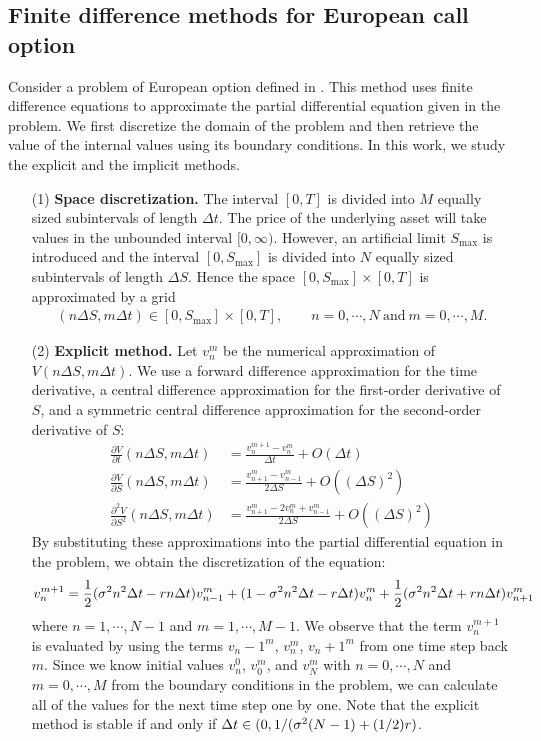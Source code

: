 \documentclass[11pt,letter]{article}
\def\D{\Delta} \def\G{\Gamma} \def\W{\Omega} \def\P{\Phi} \def\L{\Lambda} \def\Th{\Theta} \def\z{\zeta}
\theoremstyle{definition}
\theoremstyle{remark}
\numberwithin{equation}{section}
\begin{document}
\subsection{Finite difference methods for European call option} 
Consider a problem of European option defined in \cite{black1973pricing}. This method uses finite difference equations to approximate the partial differential equation given in the problem. We first discretize the domain of the problem and then retrieve the value of the internal values using its boundary conditions. In this work, we study the explicit and the implicit methods.
    \begin{itemize}
        \item[(1)] \textbf{Space discretization.} The interval $[0,T]$ is divided into $M$ equally sized subintervals of length $\D t$. The price of the underlying asset will take values in the unbounded interval $[0,\infty)$. However, an artificial limit $S_{\max}$ is introduced and the interval $[0,S_{\max}]$ is divided into $N$ equally sized subintervals of length $\D S$. Hence the space $[0,S_{\max}]\times[0,T]$ is approximated by a grid
        \begin{align}
            (n\D S,m\D t)\in[0,S_{\max}]\times[0,T],~~~~~~~~~n=0,\cdots,N~\text{and}~m=0,\cdots,M.
        \end{align}
        
        \item[(2)] \textbf{Explicit method.} Let $v_n^m$ be the numerical approximation of $V(n\D S,m\D t)$. We use a forward difference approximation for the time derivative, a central difference approximation for the first-order derivative of $S$, and a symmetric central difference approximation for the second-order derivative of $S$:
        \begin{align}
            \frac{\partial V}{\partial t}(n\D S,m\D t)&=\frac{v_n^{m+1}-v_n^m}{\D t}+O(\D t)\\
            \frac{\partial V}{\partial S}(n\D S,m\D t)&=\frac{v_{n+1}^m-v_{n-1}^m}{2\D S}+O((\D S)^2)\\
            \frac{\partial^2 V}{\partial S^2}(n\D S,m\D t)&=\frac{v_{n+1}^m-2v_n^m+v_{n-1}^m}{2\D S}+O((\D S)^2)
        \end{align}
        By substituting these approximations into the partial differential equation in the problem, we obtain the discretization of the equation:
        \begin{align}
            v_n^{m+1}=\frac{1}{2}(\s^2n^2\D t-rn\D t)v_{n-1}^m+(1-\s^2n^2\D t-r\D t)v_n^m+\frac{1}{2}(\s^2n^2\D t+rn\D t)v_{n+1}^m
        \end{align}
        where $n=1,\cdots,N-1$ and $m=1,\cdots,M-1$. We observe that the term $v_n^{m+1}$ is evaluated by using the terms $v_n-1^m$, $v_n^m$, $v_n+1^m$ from one time step back $m$. Since we know initial values $v^0_n$, $v^m_0$, and $v^m_N$ with $n=0,\cdots,N$ and $m=0,\cdots,M$ from the boundary conditions in the problem, we can calculate all of the values for the next time step one by one. Note that the explicit method is stable if and only if $\D t\in(0,1/(\s^2(N-1)+(1/2)r)$.
        

\end{itemize}
\end{document}
